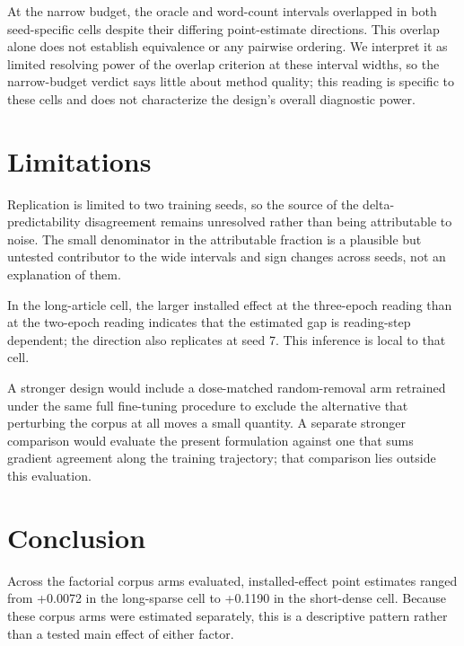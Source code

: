 \documentclass[10pt]{article}
\begin{document}
At the narrow budget, the oracle and word-count intervals overlapped in both seed-specific cells despite their differing point-estimate directions. This overlap alone does not establish equivalence or any pairwise ordering. We interpret it as limited resolving power of the overlap criterion at these interval widths, so the narrow-budget verdict says little about method quality; this reading is specific to these cells and does not characterize the design’s overall diagnostic power.







\section{ Limitations }
\label{sec:limitations}

Replication is limited to two training seeds, so the source of the delta-predictability disagreement remains unresolved rather than being attributable to noise. The small denominator in the attributable fraction is a plausible but untested contributor to the wide intervals and sign changes across seeds, not an explanation of them.



In the long-article cell, the larger installed effect at the three-epoch reading than at the two-epoch reading indicates that the estimated gap is reading-step dependent; the direction also replicates at seed 7. This inference is local to that cell.



A stronger design would include a dose-matched random-removal arm retrained under the same full fine-tuning procedure to exclude the alternative that perturbing the corpus at all moves a small quantity. A separate stronger comparison would evaluate the present formulation against one that sums gradient agreement along the training trajectory; that comparison lies outside this evaluation.







\section{ Conclusion }
\label{sec:conclusion}

Across the factorial corpus arms evaluated, installed-effect point estimates ranged from +0.0072 in the long-sparse cell to +0.1190 in the short-dense cell. Because these corpus arms were estimated separately, this is a descriptive pattern rather than a tested main effect of either factor.
\end{document}
